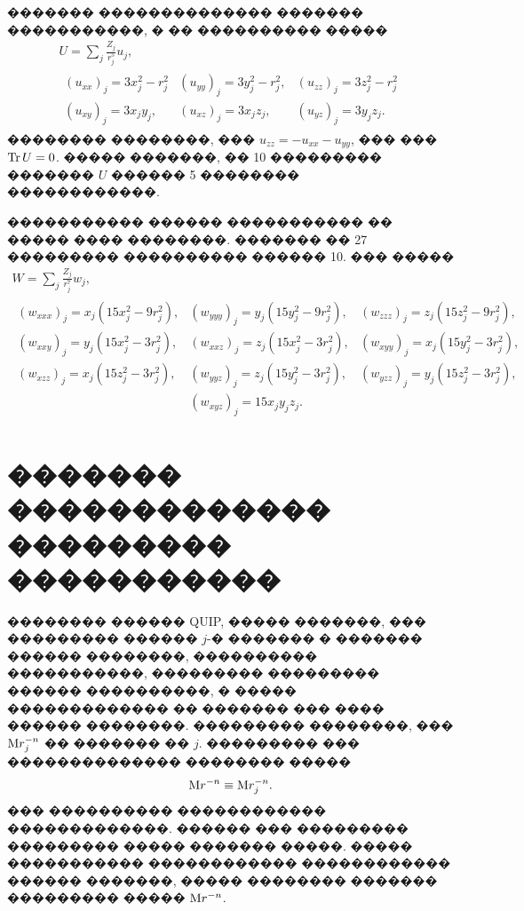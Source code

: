\documentclass[12pt,titlepage]{article}
\newcommand\M{{\rm M}} %
\begin{document}
������� �������������� ������� �����������, � �� ���������� �����
\begin{gather}
\label{momenta3}
    U=\sum_j \frac{Z_j}{r_j^5} u_j,  \\
    \label{momenta4}
    \begin{array}{ccc}
        (u_{xx})_j = {3x_{j}^{2} - r_{j}^{2} } & (u_{yy})_j = {3y_{j}^{2} - r_{j}^{2} }, & (u_{zz})_j = {3z_{j}^{2} - r_{j}^{2} } \\
        (u_{xy})_j = {3x_{j} y_{j} }, & (u_{xz})_j = {3x_{j} z_{j} }, & (u_{yz})_j = {3y_{j} z_{j} }.
    \end{array}
\end{gather}
�������� ��������, ��� $u_{zz} = - u_{xx} - u_{yy}$, ��� ��� ${\rm Tr}\, U = 0$. ����� �������, �� 10 ��������� ������� $U$ ������ 5 �������� ������������.

����������� ������ ����������� �� ����� ���� ��������. ������� �� 27 ��������� ���������� ������ 10. ��� �����
\begin{gather}
    \label{momenta5}
    W = \sum_j \frac{Z_j}{r_j^7} w_j, \\
    \label{momenta7}
    \begin{array}{ccc}
    (w_{xxx})_j = x_j (15 x_j^2 - 9r_j^2), & (w_{yyy})_j = y_j (15 y_j^2 - 9r_j^2), & (w_{zzz})_j = z_j (15 z_j^2 - 9r_j^2), \\
    (w_{xxy})_j = y_j (15 x_j^2 - 3r_j^2), & (w_{xxz})_j = z_j (15 x_j^2 - 3r_j^2), & (w_{xyy})_j = x_j (15 y_j^2 - 3r_j^2), \\
    (w_{xzz})_j = x_j (15 z_j^2 - 3r_j^2), & (w_{yyz})_j = z_j (15 y_j^2 - 3r_j^2), & (w_{yzz})_j = y_j (15 z_j^2 - 3r_j^2), \\
    & (w_{xyz})_j = 15 x_j y_j z_j. &
    \end{array}
\end{gather}

\section{������� ������������� ��������� �����������}

�������� ������ QUIP, ����� �������, ��� ��������� ������ $j$-� ������� � ������� ������ ��������, ���������� �����������, ��������� ��������� ������ ����������, � ����� ������������� �� ������� ��� ���� ������ ��������. ��������� ��������, ��� $\M r_j^{-n}$ �� ������� �� $j$. ��������� ��� �������������� �������� �����
\begin{equation}
    \label{particle_equality}
    \M r^{-n} \equiv \M r^{-n}_j.
\end{equation}
��� ���������� ������������ �������������. ������ ��� ��������� ��������� ����� ������� �����. ����� ����������� ������������ ������������ ������ �������, ����� �������� ������� ��������� ����� $\M r^{-n}$.
\end{document}
